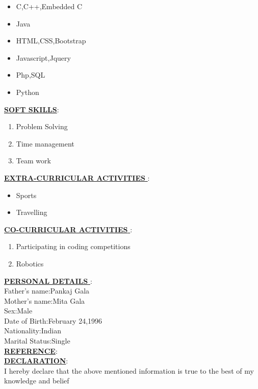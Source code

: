\documentclass[a4paper,12pt]{article}
\begin{document}
\begin{flushleft}
\begin{itemize}
 \item{C,C++,Embedded C}
 \item{Java}
 \item{HTML,CSS,Bootstrap}
 \item{Javascript,Jquery}
 \item{Php,SQL}
 \item{Python}
\end{itemize}
\underline{\textbf{SOFT SKILLS}}:\\[0.5cm]
\begin{enumerate}
 \item{Problem Solving}
 \item{Time management}
 \item{Team work}
\end{enumerate}
\underline{\textbf{EXTRA-CURRICULAR ACTIVITIES }}:\\[0.5cm]
\begin{itemize}
 \item{Sports}
 \item{Travelling}
\end{itemize}
\underline{\textbf{CO-CURRICULAR ACTIVITIES }}:\\[0.5cm]
\begin{enumerate}
 \item{Participating in coding competitions}
 \item{Robotics}
\end{enumerate}
\underline{\textbf{PERSONAL DETAILS }}:\\[0.5cm]
Father's name:Pankaj Gala\\
Mother's name:Mita Gala\\
Sex:Male\\
Date of Birth:February 24,1996\\
Nationality:Indian\\
Marital Status:Single\\[0.5cm]

\underline{\textbf{REFERENCE}}:\\[0.5cm]
\underline{\textbf{DECLARATION}}:\\[0.5cm]
I hereby declare that the above mentioned information is true to the best of my knowledge and belief
 \end{flushleft}
\end{document}
